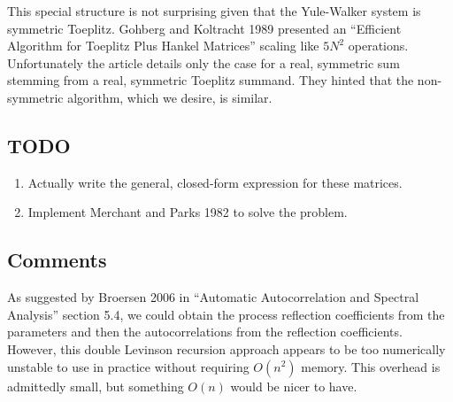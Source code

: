 \documentclass[12pt,letterpaper]{article}
\begin{document}
This special structure is not surprising given that the Yule-Walker system is
symmetric Toeplitz. Gohberg and Koltracht 1989 presented an ``Efficient
Algorithm for Toeplitz Plus Hankel Matrices'' scaling like $5N^2$ operations.
Unfortunately the article details only the case for a real, symmetric sum
stemming from a real, symmetric Toeplitz summand. They hinted that the
non-symmetric algorithm, which we desire, is similar.

\subsection*{TODO}

\begin{enumerate}
 \item Actually write the general, closed-form expression for these matrices.
 \item Implement Merchant and Parks 1982 to solve the problem.
\end{enumerate}

\subsection*{Comments}

As suggested by Broersen 2006 in ``Automatic Autocorrelation and Spectral
Analysis'' section 5.4, we could obtain the process reflection coefficients
from the parameters and then the autocorrelations from the reflection
coefficients.  However, this double Levinson recursion approach appears to be
too numerically unstable to use in practice without requiring $O(n^2)$ memory.
This overhead is admittedly small, but something $O(n)$ would be nicer to have.
\end{document}
